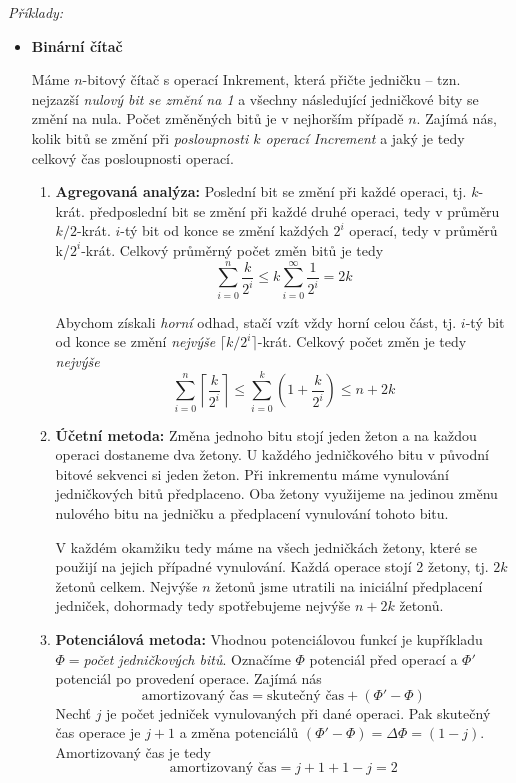 \documentclass[11pt]{report} %
\numberwithin{equation}{section}
\begin{document}
\noindent\textit{Příklady:}
\begin{itemize}
	\item \textbf{Binární čítač}
	
	Máme $n$-bitový čítač s operací Inkrement, která přičte jedničku -- tzn. nejzazší \textit{nulový bit se změní na 1} a všechny následující jedničkové bity se změní na nula. Počet změněných bitů je v nejhorším případě $n$. Zajímá nás, kolik bitů se změní při \textit{posloupnosti $k$ operací Increment} a jaký je tedy celkový čas posloupnosti operací.
	
	\begin{enumerate}
		\item \textbf{Agregovaná analýza:} Poslední bit se změní při každé operaci, tj. $k$-krát. předposlední bit se změní při každé druhé operaci, tedy v průměru $k/2$-krát. $i$-tý bit od konce se změní každých $2^i$ operací, tedy v průměrů k/$2^i$-krát. Celkový průměrný počet změn bitů je tedy $$\sum_{i=0}^{n}\frac{k}{2^i} \leq k \sum_{i=0}^{\infty} \frac{1}{2^i} = 2k$$
		
		Abychom získali \textit{horní} odhad, stačí vzít vždy horní celou část, tj. $i$-tý bit od konce se změní \textit{nejvýše} $\lceil k/2^i\rceil$-krát. Celkový počet změn je tedy \textit{nejvýše}
		$$\sum_{i=0}^{n}\left\lceil \frac{k}{2^i}\right\rceil \leq \sum_{i=0}^{k} (1 + \frac{k}{2^i}) \leq n + 2k$$
		\item \textbf{Účetní metoda:} Změna jednoho bitu stojí jeden žeton a na každou operaci dostaneme dva žetony. U každého jedničkového bitu v původní bitové sekvenci si  jeden žeton. Při inkrementu máme vynulování jedničkových bitů předplaceno. Oba žetony využijeme na jedinou změnu nulového bitu na jedničku a předplacení vynulování tohoto bitu. 
		
		V každém okamžiku tedy máme na všech jedničkách žetony, které se použijí na jejich případné vynulování. Každá operace stojí 2 žetony, tj. $2k$ žetonů celkem. Nejvýše $n$ žetonů jsme utratili na iniciální předplacení jedniček, dohormady tedy spotřebujeme nejvýše $n + 2k$ žetonů.
		
		\item\textbf{Potenciálová metoda:} Vhodnou potenciálovou funkcí je kupříkladu $\Phi = $\textit{počet jedničkových bitů}. Označíme $\Phi$ potenciál před operací a $\Phi'$ potenciál po provedení operace. Zajímá nás
		$$\text{amortizovaný čas} = \text{skutečný čas} + (\Phi' - \Phi)$$
		Nechť $j$ je počet jedniček vynulovaných při dané operaci. Pak skutečný čas operace je $j+1$ a změna potenciálů $(\Phi' - \Phi) = \Delta\Phi = (1-j)$. Amortizovaný čas je tedy
		$$\text{amortizovaný čas} = j+1 + 1-j = 2$$
		

\end{enumerate}
\end{itemize}
\end{document}
